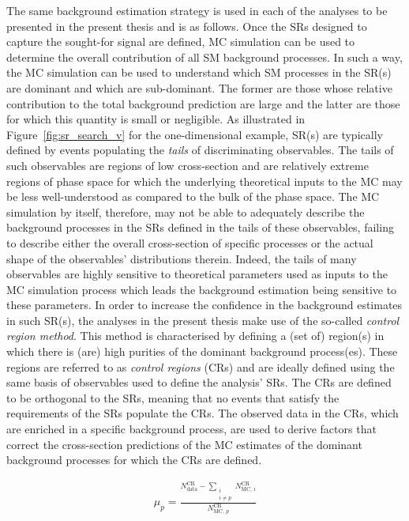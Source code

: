 The same background estimation strategy is used in each of the analyses to be presented in the
present thesis and is as follows.
Once the SRs designed to capture the sought-for signal are defined, MC simulation can be
used to determine the overall contribution of all SM background processes.
In such a way, the MC simulation can be used to understand which SM processes in the SR(s)
are dominant and which are sub-dominant.
The former are those whose relative contribution to the total background prediction
are large and the latter are those for which this quantity is small or negligible.
As illustrated in Figure~\ref{fig:sr_search_v} for the one-dimensional example,
SR(s) are typically defined by events populating the \textit{tails} of discriminating
observables.
The tails of such observables are regions of low cross-section and
are relatively extreme regions of phase space for which the underlying theoretical inputs
to the MC may be less well-understood as compared to the bulk of the phase space.
The MC simulation by itself, therefore, may not be able to adequately describe the background
processes in the SRs defined in the tails of these observables, failing to describe
either the overall cross-section of specific processes or the actual shape of the observables' distributions
therein.
Indeed, the tails of many observables are highly sensitive to theoretical parameters used as
inputs to the MC simulation process which leads the background estimation being sensitive to these
parameters.
In order to increase the confidence in the background estimates in such SR(s), the analyses in the present
thesis make use of the so-called \textit{control region method}.
This method is characterised by defining a (set of) region(s) in which there is (are) high purities
of the dominant background process(es).
These regions are referred to as \textit{control regions} (CRs) and are ideally defined using the
same basis of observables used to define the analysis' SRs.
The CRs are defined to be orthogonal to the SRs, meaning that no events that satisfy the requirements of
the SRs populate the CRs.
The observed data in the CRs, which are enriched in a specific background process, are used to derive
factors that correct the cross-section predictions of the MC estimates of the dominant background processes for
which the CRs are defined.

\begin{align}
    \mu_{p} = \frac{  N_{\text{data}}^{\text{CR}} - \sum\limits_{\substack{i \\ i\ne p}} N_{\text{MC},\,i}^{\text{CR}}} { N_{\text{MC},\,p}^{\text{CR}}    }
\end{align}

